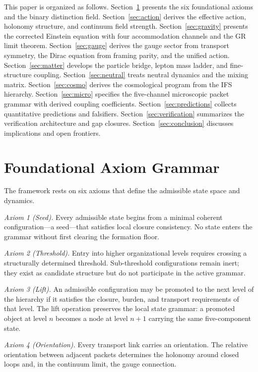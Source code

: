 \documentclass[11pt,twocolumn]{article}
\begin{document}
This paper is organized as follows.
Section~\ref{sec:axioms} presents the six foundational axioms and the binary distinction field.
Section~\ref{sec:action} derives the effective action, holonomy structure, and continuum field strength.
Section~\ref{sec:gravity} presents the corrected Einstein equation with four accommodation channels and the GR limit theorem.
Section~\ref{sec:gauge} derives the gauge sector from transport symmetry, the Dirac equation from framing parity, and the unified action.
Section~\ref{sec:matter} develops the particle bridge, lepton mass ladder, and fine-structure coupling.
Section~\ref{sec:neutral} treats neutral dynamics and the mixing matrix.
Section~\ref{sec:cosmo} derives the cosmological program from the IFS hierarchy.
Section~\ref{sec:micro} specifies the five-channel microscopic packet grammar with derived coupling coefficients.
Section~\ref{sec:predictions} collects quantitative predictions and falsifiers.
Section~\ref{sec:verification} summarizes the verification architecture and gap closures.
Section~\ref{sec:conclusion} discusses implications and open frontiers.


\section{Foundational Axiom Grammar}
\label{sec:axioms}

The framework rests on six axioms that define the admissible state space and dynamics.

\emph{Axiom 1 (Seed).}
Every admissible state begins from a minimal coherent configuration---a seed---that satisfies local closure consistency.
No state enters the grammar without first clearing the formation floor.

\emph{Axiom 2 (Threshold).}
Entry into higher organizational levels requires crossing a structurally determined threshold.
Sub-threshold configurations remain inert; they exist as candidate structure but do not participate in the active grammar.

\emph{Axiom 3 (Lift).}
An admissible configuration may be promoted to the next level of the hierarchy if it satisfies the closure, burden, and transport requirements of that level.
The lift operation preserves the local state grammar: a promoted object at level $n$ becomes a node at level $n+1$ carrying the same five-component state.

\emph{Axiom 4 (Orientation).}
Every transport link carries an orientation.
The relative orientation between adjacent packets determines the holonomy around closed loops and, in the continuum limit, the gauge connection.
\end{document}
